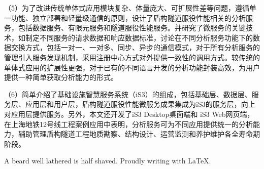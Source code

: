\begin{cabstract}
（5）为了改进传统单体式应用模块复杂、体量庞大、可扩展性差等问题，遵循单一功能、独立部署和轻量级通信的原则，设计了盾构隧道服役性能相关的分析服务，包括数据服务、有限元服务和隧道服役性能服务。并研究了微服务的关键技术，如制定不同服务的请求数据和响应数据标准，讨论在不同分析服务功能下的数据交换方式，包括一对一、一对多、同步、异步的通信模式，对于所有分析服务的管理引入服务发现机制，采用注册中心方式对外提供一致性的调用方式。较传统的单体式应用的扩展性更强，对于已有的不同语言开发的分析功能封装高效，为用户提供一种简单获取分析能力的形式。

（6）简单介绍了基础设施智慧服务系统（iS3）的组成，包括基础层、数据层、服务层、应用层和用户层，盾构隧道服役性能微服务成果集成为iS3的服务层，向上对应用层提供服务。另外，本文还开发了iS3 Desktop桌面端和 iS3 Web网页端，在上海地铁12号线工程案例应用中表明，分析服务可为不同应用提供统一的分析能力，辅助管理盾构隧道工程地质勘察、结构设计、运营监测和养护维护各全寿命期阶段。

\end{cabstract}



\begin{eabstract}

A beard well lathered is half shaved. Proudly writing with \LaTeX{}.

\end{eabstract}

